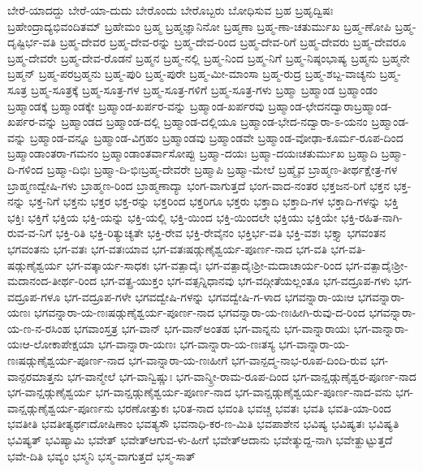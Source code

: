 {ಬೇರೆ-ಯಾದದ್ದು
ಬೇರೆ-ಯಾ-ದುದು
ಬೇರೊಂದು
ಬೇರೊಬ್ಬರು
ಬೋಧಿಸುವ
ಬ್ರಹ
ಬ್ರಹೃದ್ವಿಷಃ
ಬ್ರಹೇಂದ್ರಾದ್ಯಭಿವಂದಿತಮ್
ಬ್ರಹೇಮಂ
ಬ್ರಹ್ಮ
ಬ್ರಹ್ಮಜ್ಞಾನಿನೋ
ಬ್ರಹ್ಮಣಾ
ಬ್ರಹ್ಮ-ಣಾ-ಚತುರ್ಮುಖ
ಬ್ರಹ್ಮ-ಣೋಪಿ
ಬ್ರಹ್ಮ-ದೃಷ್ಟಿರ್ಭ-ವತಿ
ಬ್ರಹ್ಮ-ದೇವರ
ಬ್ರಹ್ಮ-ದೇವ-ರನ್ನು
ಬ್ರಹ್ಮ-ದೇವ-ರಿಂದ
ಬ್ರಹ್ಮ-ದೇವ-ರಿಗೆ
ಬ್ರಹ್ಮ-ದೇವರು
ಬ್ರಹ್ಮ-ದೇವರೂ
ಬ್ರಹ್ಮ-ದೇವರೇ
ಬ್ರಹ್ಮ-ದೇವ-ರೊಡನೆ
ಬ್ರಹ್ಮನ
ಬ್ರಹ್ಮ-ನಲ್ಲಿ
ಬ್ರಹ್ಮ-ನಿಂದ
ಬ್ರಹ್ಮ-ನಿಗೆ
ಬ್ರಹ್ಮ-ನಿಷ್ಠಂಭಾಷ್ಯ
ಬ್ರಹ್ಮನು
ಬ್ರಹ್ಮನೇ
ಬ್ರಹ್ಮನ್
ಬ್ರಹ್ಮ-ಪರಬ್ರಹ್ಮನು
ಬ್ರಹ್ಮ-ಪುರಿ
ಬ್ರಹ್ಮ-ಪುರೇ
ಬ್ರಹ್ಮ-ಮೀ-ಮಾಂಸಾ
ಬ್ರಹ್ಮ-ರುದ್ರ
ಬ್ರಹ್ಮ-ಶಬ್ದ-ವಾಚ್ಯನು
ಬ್ರಹ್ಮ-ಸೂತ್ರ
ಬ್ರಹ್ಮ-ಸೂತ್ರಕ್ಕೆ
ಬ್ರಹ್ಮ-ಸೂತ್ರ-ಗಳ
ಬ್ರಹ್ಮ-ಸೂತ್ರ-ಗಳಿಗೆ
ಬ್ರಹ್ಮ-ಸೂತ್ರ-ಗಳು
ಬ್ರಹ್ಮಾ
ಬ್ರಹ್ಮಾಂಡ
ಬ್ರಹ್ಮಾಂಡಂ
ಬ್ರಹ್ಮಾಂಡಕ್ಕೆ
ಬ್ರಹ್ಮಾಂಡಕ್ಕೇ
ಬ್ರಹ್ಮಾಂಡ-ಖರ್ಪರ-ವನ್ನು
ಬ್ರಹ್ಮಾಂಡ-ಖರ್ಪರವು
ಬ್ರಹ್ಮಾಂಡ-ಛೇದನದ್ವಾರಾಬ್ರಹ್ಮಾಂಡ-ಖರ್ಪರ-ವನ್ನು
ಬ್ರಹ್ಮಾಂಡದ
ಬ್ರಹ್ಮಾಂಡ-ದಲ್ಲಿ
ಬ್ರಹ್ಮಾಂಡ-ದಲ್ಲಿಯೂ
ಬ್ರಹ್ಮಾಂಡ-ಭೇದ-ನದ್ವಾರಾ-ಽ-ಯನಂ
ಬ್ರಹ್ಮಾಂಡ-ವನ್ನು
ಬ್ರಹ್ಮಾಂಡ-ವನ್ನೂ
ಬ್ರಹ್ಮಾಂಡ-ವಿಗ್ರಹಂ
ಬ್ರಹ್ಮಾಂಡವು
ಬ್ರಹ್ಮಾಂಡವೇ
ಬ್ರಹ್ಮಾಂಡ-ವೋಢಾ-ಕೂರ್ಮ-ರೂಪ-ದಿಂದ
ಬ್ರಹ್ಮಾಂಡಾಂತರಾ-ಗಮನಂ
ಬ್ರಹ್ಮಾಂಡಾಂತರ್ವಾಸೋಪ್ಪು
ಬ್ರಹ್ಮಾ-ದಯಃ
ಬ್ರಹ್ಮಾ-ದಯಃಚತುರ್ಮುಖ
ಬ್ರಹ್ಮಾದಿ
ಬ್ರಹ್ಮಾ-ದಿ-ಗಳಿಂದ
ಬ್ರಹ್ಮಾ-ದಿಭಿಃ
ಬ್ರಹ್ಮಾ-ದಿ-ಭಿಃಬ್ರಹ್ಮ-ದೇವರೇ
ಬ್ರಹ್ಮಾಪಿ
ಬ್ರಹ್ಮಾ-ಮೇಲೆ
ಬ್ರಹ್ಮೈವ
ಬ್ರಾಹ್ಮಣ-ತೀರ್ಥಕ್ಷೇತ್ರ-ಗಳ
ಬ್ರಾಹ್ಮಣದ್ವೇಷಿ-ಗಳು
ಬ್ರಾಹ್ಮಣ-ರಿಂದ
ಬ್ರಾಹ್ಮಣಾದ್ಯಾ
ಭಂಗ-ವಾಗುತ್ತದೆ
ಭಂಗ-ವಾದ-ನಂತರ
ಭಕ್ತಜನ-ರಿಗೆ
ಭಕ್ತನ
ಭಕ್ತ-ನನ್ನು
ಭಕ್ತ-ನಿಗೆ
ಭಕ್ತನು
ಭಕ್ತರ
ಭಕ್ತ-ರನ್ನು
ಭಕ್ತರಿಂದ
ಭಕ್ತರಿಗೂ
ಭಕ್ತರು
ಭಕ್ತಾದಿ
ಭಕ್ತಾದಿ-ಗಳ
ಭಕ್ತಾದಿ-ಗಳನ್ನು
ಭಕ್ತಿ
ಭಕ್ತಿಃ
ಭಕ್ತಿಗೆ
ಭಕ್ತಿಯ
ಭಕ್ತಿ-ಯನ್ನು
ಭಕ್ತಿ-ಯಲ್ಲಿ
ಭಕ್ತಿ-ಯಿಂದ
ಭಕ್ತಿ-ಯಿಂದಲೇ
ಭಕ್ತಿಯು
ಭಕ್ತಿಯೇ
ಭಕ್ತಿ-ರಹಿತ-ನಾಗಿ-ರುವ-ವ-ನಿಗೆ
ಭಕ್ತಿ-ರಿತಿ
ಭಕ್ತಿ-ರಿತ್ಯುಚ್ಯತೇ
ಭಕ್ತಿ-ರೇವ
ಭಕ್ತಿ-ರೇವೈನಂ
ಭಕ್ತಿರ್ಭ-ವತಿ
ಭಕ್ತಿ-ವಶಃ
ಭಕ್ತ್ಯಾ
ಭಗವಂತನ
ಭಗವಂತನು
ಭಗ-ವತಃ
ಭಗ-ವತಃಯಾವ
ಭಗ-ವತಃಷಡ್ಗುಣೈಶ್ವರ್ಯ-ಪೂರ್ಣ-ನಾದ
ಭಗ-ವತಿ
ಭಗ-ವತಿ-ಷಡ್ಗುಣೈಶ್ವರ್ಯ
ಭಗ-ವತ್ಕಾರ್ಯ-ಸಾಧಕಃ
ಭಗ-ವತ್ಪಾದೈಃ
ಭಗ-ವತ್ಪಾದೈಃಶ್ರೀ-ಮದಾಚಾರ್ಯ-ರಿಂದ
ಭಗ-ವತ್ಪಾದೈಃಶ್ರೀ-ಮದಾನಂದ-ತೀರ್ಥ-ರಿಂದ
ಭಗ-ವತ್ಪ್ರ-ಯುಕ್ತಂ
ಭಗ-ವತ್ಸನ್ನಿಧಾನವು
ಭಗ-ವದ್ಗೀತೆಯಲ್ಲಂತೂ
ಭಗ-ವದ್ರೂಪ-ಗಳು
ಭಗ-ವದ್ರೂಪ-ಗಳೂ
ಭಗ-ವದ್ರೂಪ-ಗಳೇ
ಭಗವದ್ವೇಷಿ-ಗಳನ್ನು
ಭಗವದ್ವೇಷಿ-ಗ-ಳಾದ
ಭಗವನ್ನಾರಾ-ಯಃಆ
ಭಗವನ್ನಾರಾ-ಯಣಃ
ಭಗವನ್ನಾರಾ-ಯ-ಣಃಷಡ್ಗುಣೈಶ್ವರ್ಯ-ಪೂರ್ಣ-ನಾದ
ಭಗವನ್ನಾರಾ-ಯ-ಣಃಹೀಗಿ-ರುವು-ದ-ರಿಂದ
ಭಗವನ್ನಾರಾ-ಯ-ಣ-ನ-ರಸಿಂಹ
ಭಗವಾಂಸ್ತತ್ರ
ಭಗ-ವಾನ್
ಭಗ-ವಾನ್ಅಂತಹ
ಭಗ-ವಾನ್ನನು
ಭಗ-ವಾನ್ನಾರಾಯಃ
ಭಗ-ವಾನ್ನಾರಾ-ಯಃಆ-ಲೋಕಾಪೇಕ್ಷಯಾ
ಭಗ-ವಾನ್ನಾರಾ-ಯಣಃ
ಭಗ-ವಾನ್ನಾರಾ-ಯ-ಣಃತಸ್ಯ
ಭಗ-ವಾನ್ನಾರಾ-ಯ-ಣಃಷಡ್ಗುಣೈಶ್ವರ್ಯ-ಪೂರ್ಣ-ನಾದ
ಭಗ-ವಾನ್ನಾರಾ-ಯ-ಣಃಹೀಗೆ
ಭಗ-ವಾನ್ಪದ್ಮ-ನಾಭ-ರೂಪ-ದಿಂದಿ-ರುವ
ಭಗ-ವಾನ್ಪರಮಾತ್ತನು
ಭಗ-ವಾನ್ಮೇಲೆ
ಭಗ-ವಾನ್ವಿಷ್ಣುಃ
ಭಗ-ವಾನ್ಶ್ರೀ-ರಾಮ-ರೂಪ-ದಿಂದ
ಭಗ-ವಾನ್ಷಡ್ಗುಣೈಶ್ವರ-ಪೂರ್ಣ-ನಾದ
ಭಗ-ವಾನ್ಷಡ್ಗುಣೈಶ್ವರ್ಯ
ಭಗ-ವಾನ್ಷಡ್ಗುಣೈಶ್ವರ್ಯ-ಪೂರ್ಣ-ನಾದ
ಭಗ-ವಾನ್ಷಡ್ಗುಣೈಶ್ವರ್ಯ-ಪೂರ್ಣ-ನಾದ-ವನು
ಭಗ-ವಾನ್ಷಡ್ಗುಣೈಶ್ವರ್ಯ-ಪೂರ್ಣನು
ಭರಣೋತ್ತುಕಃ
ಭರಿತ-ನಾದ
ಭವಂತಿ
ಭವಚ್ಚ
ಭವತಃ
ಭವತಿ
ಭವತಿ-ಯಾ-ರಿಂದ
ಭವತೀತಿ
ಭವತೀತ್ಯರ್ಥಃದೋಷಿಣಾಂ
ಭವತ್ಯಸೌ
ಭವನಾಧಿ-ಕರ-ಣ-ಮಿತಿ
ಭವಪಾಶೇನ
ಭವಿಷ್ಯ
ಭವಿಷ್ಯತಃ
ಭವಿಷ್ಯತಿ
ಭವಿಷ್ಯತ್
ಭವಿಷ್ಯಾಮಿ
ಭವೇತ್
ಭವೇತ್ಆಗುವ-ಳು-ಹೀಗೆ
ಭವೇತ್ಆದಾನು
ಭವೇತ್ಶುದ್ದ-ನಾಗಿ
ಭವೇತ್ಹುಟ್ಟುತ್ತದೆ
ಭವೇ-ದಿತಿ
ಭವ್ಯಂ
ಭಸ್ಮನಿ
ಭಸ್ಮ-ವಾಗುತ್ತದೆ
ಭಸ್ಮ-ಸಾತ್
}
